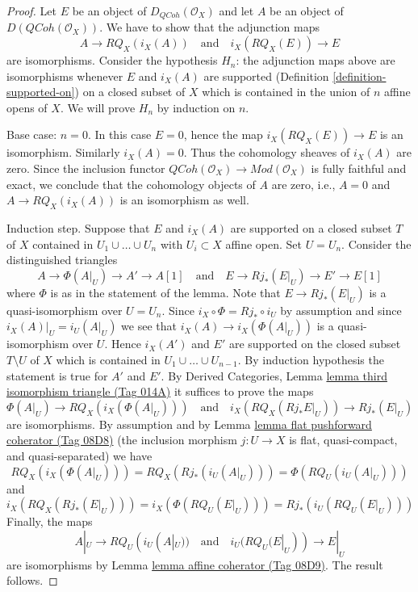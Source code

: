 \documentclass{amsart}
\theoremstyle{plain}
\theoremstyle{definition}
\theoremstyle{remark}
\numberwithin{equation}{subsection}
\def\QCoh{\mathit{QCoh}}
\begin{document}
\begin{proof}
Let $E$ be an object of $D_\QCoh(\mathcal{O}_X)$ and
let $A$ be an object of $D(\QCoh(\mathcal{O}_X))$.
We have to show that the adjunction maps
$$
A \to RQ_X(i_X(A))
\quad\text{and}\quad
i_X(RQ_X(E)) \to E
$$
are isomorphisms. Consider the hypothesis
$H_n$: the adjunction maps above are isomorphisms
whenever $E$ and $i_X(A)$ are supported
(Definition \ref{definition-supported-on})
on a closed subset of $X$ which
is contained in the union of $n$ affine opens of $X$.
We will prove $H_n$ by induction on $n$.

\medskip\noindent
Base case: $n = 0$. In this case $E = 0$, hence the map
$i_X(RQ_X(E)) \to E$ is an isomorphism. Similarly $i_X(A) = 0$.
Thus the cohomology sheaves of $i_X(A)$ are zero. Since the inclusion
functor $\QCoh(\mathcal{O}_X) \to \textit{Mod}(\mathcal{O}_X)$
is fully faithful and exact, we conclude that the cohomology
objects of $A$ are zero, i.e., $A = 0$ and
$A \to RQ_X(i_X(A))$ is an isomorphism as well.

\medskip\noindent
Induction step. Suppose that $E$ and $i_X(A)$ are supported on a
closed subset $T$ of $X$ contained in $U_1 \cup \ldots \cup U_n$
with $U_i \subset X$ affine open. Set $U = U_n$.
Consider the distinguished triangles
$$
A \to \Phi(A|_U) \to A' \to A[1]
\quad\text{and}\quad
E \to Rj_*(E|_U) \to E' \to E[1]
$$
where $\Phi$ is as in the statement of the lemma.
Note that $E \to Rj_*(E|_U)$ is a quasi-isomorphism over $U = U_n$.
Since $i_X \circ \Phi = Rj_* \circ i_U$ by assumption
and since $i_X(A)|_U = i_U(A|_U)$
we see that $i_X(A) \to i_X(\Phi(A|_U))$ is a quasi-isomorphism over $U$.
Hence $i_X(A')$ and $E'$ are supported on the closed
subset $T \setminus U$ of $X$ which is contained in
$U_1 \cup \ldots \cup U_{n - 1}$.
By induction hypothesis the statement is true for $A'$ and $E'$. By
Derived Categories, Lemma \href{https://stacks.math.columbia.edu/tag/014A}{lemma third isomorphism triangle (Tag 014A)}
it suffices to prove the maps
$$
\Phi(A|_U) \to RQ_X(i_X(\Phi(A|_U)))
\quad\text{and}\quad
i_X(RQ_X(Rj_*E|_U)) \to Rj_*(E|_U)
$$
are isomorphisms. By assumption and by
Lemma \href{https://stacks.math.columbia.edu/tag/08D8}{lemma flat pushforward coherator (Tag 08D8)}
(the inclusion morphism $j : U \to X$ is flat, quasi-compact, and
quasi-separated) we have
$$
RQ_X(i_X(\Phi(A|_U))) = RQ_X(Rj_*(i_U(A|_U))) = \Phi(RQ_U(i_U(A|_U)))
$$
and
$$
i_X(RQ_X(Rj_*(E|_U))) = i_X(\Phi(RQ_U(E|_U))) = Rj_*(i_U(RQ_U(E|_U)))
$$
Finally, the maps
$$
A|_U \to RQ_U(i_U(A|_U))
\quad\text{and}\quad
i_U(RQ_U(E|_U)) \to E|_U
$$
are isomorphisms by Lemma \href{https://stacks.math.columbia.edu/tag/08D9}{lemma affine coherator (Tag 08D9)}. The result follows.
\end{proof}
\end{document}
